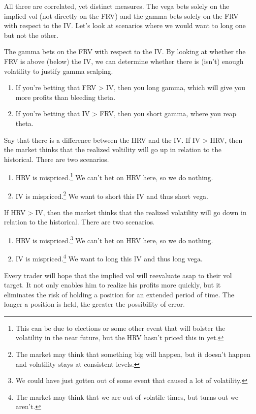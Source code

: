 \documentclass{article}
\begin{document}
    All three are correlated, yet distinct measures. The vega bets solely on the implied vol (not directly on the FRV) and the gamma bets solely on the FRV with respect to the IV. Let's look at scenarios where we would want to long one but not the other.

    \begin{example}
      The gamma bets on the FRV with respect to the IV. By looking at whether the FRV is above (below) the IV, we can determine whether there is (isn't) enough volatility to justify gamma scalping.
      \begin{enumerate}
        \item If you're betting that FRV > IV, then you long gamma, which will give you more profits than bleeding theta.
        \item If you're betting that IV > FRV, then you short gamma, where you reap theta.
      \end{enumerate}
    \end{example}

    \begin{example}
      Say that there is a difference between the HRV and the IV. If IV > HRV, then the market thinks that the realized voltility will go up in relation to the historical. There are two scenarios.
      \begin{enumerate}
        \item HRV is mispriced.\footnote{This can be due to elections or some other event that will bolster the volatility in the near future, but the HRV hasn't priced this in yet. } We can't bet on HRV here, so we do nothing.
        \item IV is mispriced.\footnote{The market may think that something big will happen, but it doesn't happen and volatility stays at consistent levels. } We want to short this IV and thus short vega.
      \end{enumerate}

      If HRV > IV, then the market thinks that the realized volatility will go down in relation to the historical. There are two scenarios.
      \begin{enumerate}
        \item HRV is mispriced.\footnote{We could have just gotten out of some event that caused a lot of volatility.} We can't bet on HRV here, so we do nothing.
        \item IV is mispriced.\footnote{The market may think that we are out of volatile times, but turns out we aren't.} We want to long this IV and thus long vega.
      \end{enumerate}
      Every trader will hope that the implied vol will reevaluate asap to their vol target. It not only enables him to realize his profits more quickly, but it eliminates the risk of holding a position for an extended period of time. The longer a position is held, the greater the possibility of error.
    \end{example}
\end{document}
